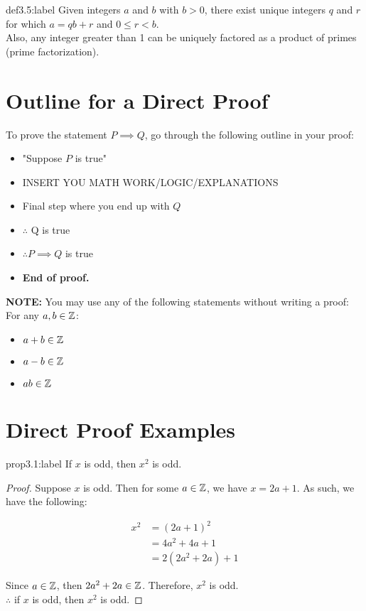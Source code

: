 \begin{definition}{def3.5:label}
    Given integers $a$ and $b$ with $b>0$, there exist unique integers $q$ and $r$ for which $a=qb+r$ and $0 \le r < b$.\\

    Also, any integer greater than 1 can be uniquely factored as a product of primes (prime factorization).
\end{definition}

\section{Outline for a Direct Proof}

To prove the statement $P\implies Q$, go through the following outline in your proof:

\begin{itemize}
    \item "Suppose $P$ is true"
    \item INSERT YOU MATH WORK/LOGIC/EXPLANATIONS
    \item Final step where you end up with $Q$
    \item $\therefore$ Q is true
    \item $\therefore P \implies Q$ is true
    \item \textbf{End of proof.} 
\end{itemize}

\textbf{NOTE:} You may use any of the following statements without writing a proof:\\

For any $a,b\in\mathbb{Z}$:

\begin{itemize}
    \item $a+b\in\mathbb{Z}$
    \item $a-b\in\mathbb{Z}$
    \item $ab \in \mathbb{Z}$
\end{itemize}
\newpage

\section{Direct Proof Examples}

\begin{proposition}{prop3.1:label}
    If $x$ is odd, then $x^2$ is odd.
\end{proposition}

\begin{proof}
    Suppose $x$ is odd. Then for some $a \in \mathbb{Z}$, we have $x = 2a+1$. As such, we have the following:

    $$
    \begin{aligned}
        x^2 &= (2a+1)^2\\
        &= 4a^2 + 4a + 1\\
        &= 2(2a^2+2a)+1
    \end{aligned}
    $$

    Since $a \in \mathbb{Z}$, then $2a^2+2a \in \mathbb{Z}$. Therefore, $x^2$ is odd.\\

    $\therefore$ if $x$ is odd, then $x^2$ is odd.
\end{proof}



